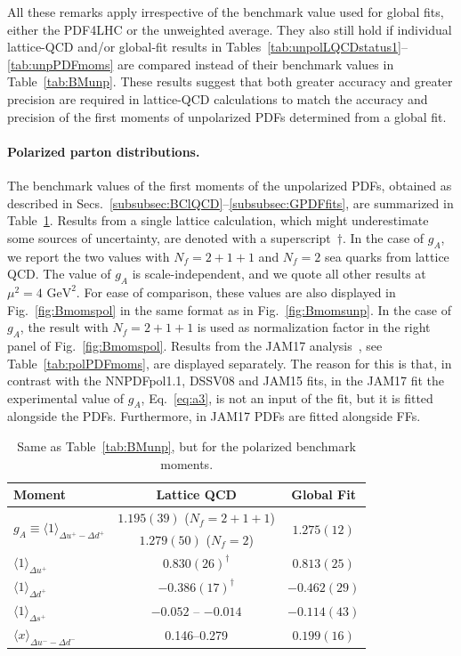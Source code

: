All these remarks apply irrespective of the benchmark value used for 
global fits, either the PDF4LHC or the unweighted average.
%
They also still hold if individual lattice-QCD and/or global-fit
results in Tables~\ref{tab:unpolLQCDstatus1}--\ref{tab:unpPDFmoms} are 
compared instead of their benchmark values in Table~\ref{tab:BMunp}. 
%
These results suggest that both greater accuracy and greater precision are
required in lattice-QCD calculations to match the accuracy and 
precision of the first moments of unpolarized PDFs determined from a global
fit.

\paragraph{Polarized parton distributions.}
%
The benchmark values of the first moments of the unpolarized PDFs, obtained
as described in Secs.~\ref{subsubsec:BClQCD}--\ref{subsubsec:GPDFfits}, 
are summarized in Table~\ref{tab:BMpol}.
%
Results from a single lattice calculation, which might underestimate some 
sources of uncertainty, are denoted with a superscript~$\dagger$.
%
In the case of $g_A$, we report the two values with $N_f=2+1+1$ and
$N_f=2$ sea quarks from lattice QCD.
%
The value of $g_A$ is scale-independent, and we quote all other results at 
$\mu^2=4\mbox{ GeV}^2$.
%
For ease of comparison, these values are also displayed in 
Fig.~\ref{fig:Bmomspol} in the same format as in Fig.~\ref{fig:Bmomsunp}.
%
In the case of $g_A$, the result with $N_f=2+1+1$ is used as normalization
factor in the right panel of Fig.~\ref{fig:Bmomspol}.
%
Results from the JAM17 analysis~\cite{Ethier:2017zbq}, see 
Table~\ref{tab:polPDFmoms}, are displayed separately.
%
The reason for this is that, 
in contrast with the NNPDFpol1.1, DSSV08 and JAM15 fits, in the JAM17 fit 
the experimental value of $g_A$, Eq.~\eqref{eq:a3}, 
is not an input of the fit, but it is fitted alongside the PDFs.
%
Furthermore, in JAM17 PDFs are fitted alongside FFs.
\begin{table}[!t]
\centering
\renewcommand{\arraystretch}{1.2}
\begin{tabular}{lcc}
\toprule
Moment & Lattice QCD & Global Fit\\
\midrule
\multirow{2}{*}{$g_A\equiv\langle 1\rangle_{\Delta u^+ - \Delta d^+}$} 
& $1.195(39)$ ($N_f=2+1+1$) 
& \multirow{2}{*}{$1.275(12)$} \\
& $1.279(50)$ ($N_f=2$) & \\
$\langle 1 \rangle_{\Delta u^+}$     
& $0.830(26)^\dagger$ 
& $0.813(25)$\\
$\langle 1 \rangle_{\Delta d^+}$     
& $-0.386(17)^\dagger$ 
& $-0.462(29)$\\
$\langle 1 \rangle_{\Delta s^+}$     
& $-0.052$ -- $-0.014$
& $-0.114(43)$\\
$\langle x\rangle_{\Delta u^- - \Delta d^-}$       
& \numrange{0.146}{0.279} 
& $0.199(16)$\\
\bottomrule
\end{tabular}
\caption{\small Same as Table~\ref{tab:BMunp}, but for the polarized benchmark 
moments.}
\label{tab:BMpol}
\end{table}
